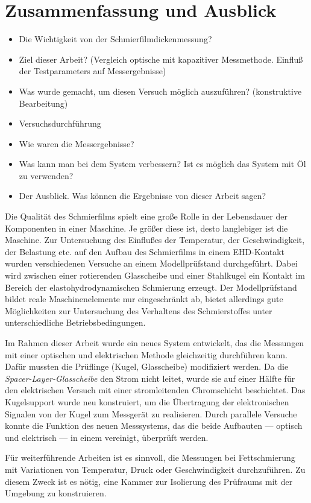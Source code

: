 \chapter{Zusammenfassung und Ausblick}
\label{zusammenfassung_und_ausblick}

\begin{itemize}
    \item Die Wichtigkeit von der Schmierfilmdickenmessung?
    \item Ziel dieser Arbeit? (Vergleich optische mit kapazitiver Messmethode. Einfluß der Testparameters auf Messergebnisse)
    \item Was wurde gemacht, um diesen Versuch möglich auszuführen? (konstruktive Bearbeitung)
    \item Versuchsdurchführung
    \item Wie waren die Messergebnisse?
    \item Was kann man bei dem System verbessern? Ist es möglich das System mit Öl zu verwenden?
    \item Der Ausblick. Was können die Ergebnisse von dieser Arbeit sagen?
\end{itemize}

Die Qualität des Schmierfilms spielt eine große Rolle in der Lebensdauer der Komponenten in einer Maschine.
Je größer diese ist, desto langlebiger ist die Maschine.
Zur Untersuchung des Einflußes der Temperatur, der Geschwindigkeit, der Belastung etc. auf den Aufbau des Schmierfilms in einem EHD-Kontakt wurden verschiedenen Versuche an einem Modellprüfstand durchgeführt.
Dabei wird zwischen einer rotierenden Glasscheibe und einer Stahlkugel ein Kontakt im Bereich der elastohydrodynamischen Schmierung erzeugt.
Der Modellprüfstand bildet reale Maschinenelemente nur eingeschränkt ab, bietet allerdings gute Möglichkeiten zur Untersuchung des Verhaltens des Schmierstoffes unter unterschiedliche Betriebsbedingungen.

Im Rahmen dieser Arbeit wurde ein neues System entwickelt, das die Messungen mit einer optischen und elektrischen Methode gleichzeitig durchführen kann.
Dafür mussten die Prüflinge (Kugel, Glasscheibe) modifiziert werden.
Da die \textit{Spacer-Layer-Glasscheibe} den Strom nicht leitet, wurde sie auf einer Hälfte für den elektrischen Versuch mit einer stromleitenden Chromschicht beschichtet.
Das Kugelsupport wurde neu konstruiert, um die Übertragung der elektronischen Signalen von der Kugel zum Messgerät zu realisieren.
Durch parallele Versuche konnte die Funktion des neuen Messsystems, das die beide Aufbauten --- optisch und elektrisch --- in einem vereinigt, überprüft werden.


Für weiterführende Arbeiten ist es sinnvoll, die Messungen bei Fettschmierung mit Variationen von Temperatur, Druck oder Geschwindigkeit durchzuführen.
Zu diesem Zweck ist es nötig, eine Kammer zur Isolierung des Prüfraums mit der Umgebung zu konstruieren.


